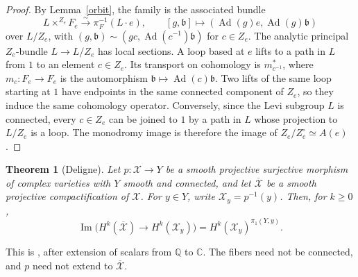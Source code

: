 \documentclass[12pt]{article}
\theoremstyle{paperplain}
\newtheorem{theorem}{Theorem}[section]
\DeclareMathOperator{\Ad}{Ad}
\DeclareMathOperator{\im}{Im}
\newcommand{\C}{\mathbb C}
\begin{document}
\begin{proof}
    By Lemma~\ref{orbit}, the family is the associated bundle
    \[
        L\times^{Z_e} F_e\xrightarrow{\sim}\pi_F^{-1}(L\cdot e),\qquad
        [g,\mathfrak b]\longmapsto(\Ad(g)e,\Ad(g)\mathfrak b)
    \]
    over $L/Z_e$, with $(g,\mathfrak b)\sim(gc,\Ad(c^{-1})\mathfrak b)$ for $c\in Z_e$. The analytic principal $Z_e$-bundle $L\to L/Z_e$ has local sections. A loop based at $e$ lifts to a path in $L$ from $1$ to an element $c\in Z_e$. Its transport on cohomology is $m_{c^{-1}}^*$, where $m_c\colon F_e\to F_e$ is the automorphism $\mathfrak b\mapsto\Ad(c)\mathfrak b$. Two lifts of the same loop starting at $1$ have endpoints in the same connected component of $Z_e$, so they induce the same cohomology operator. Conversely, since the Levi subgroup $L$ is connected, every $c\in Z_e$ can be joined to $1$ by a path in $L$ whose projection to $L/Z_e$ is a loop. The monodromy image is therefore the image of $Z_e/Z_e^\circ\simeq A(e)$.
\end{proof}

\begin{theorem}[Deligne]\label{cycles}
    Let $p\colon\mathcal X\to Y$ be a smooth projective surjective morphism of complex varieties with $Y$ smooth and connected, and let $\overline{\mathcal X}$ be a smooth projective compactification of $\mathcal X$. For $y\in Y$, write $\mathcal X_y=p^{-1}(y)$. Then, for $k\ge0$,
    \[
        \im\bigl(H^k(\overline{\mathcal X})\longrightarrow H^k(\mathcal X_y)\bigr)
            =H^k(\mathcal X_y)^{\pi_1(Y,y)}.
    \]
\end{theorem}

This is \cite[Th\'eor\`eme~4.1.1(ii)]{Deligne}, after extension of scalars from $\mathbb Q$ to $\C$. The fibers need not be connected, and $p$ need not extend to $\overline{\mathcal X}$.
\end{document}
